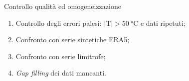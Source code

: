 \begin{frame}{Controllo qualità ed omogeneizzazione}
  \begin{enumerate}
    \item Controllo degli errori palesi: \(\lvert \mathrm{T} \rvert > \qty{50}{\degreeCelsius}\) e dati ripetuti;
    \item Confronto con serie sintetiche ERA5;
    \item Confronto con serie limitrofe;
    \item \emph{Gap filling} dei dati mancanti.
  \end{enumerate}
\end{frame}
